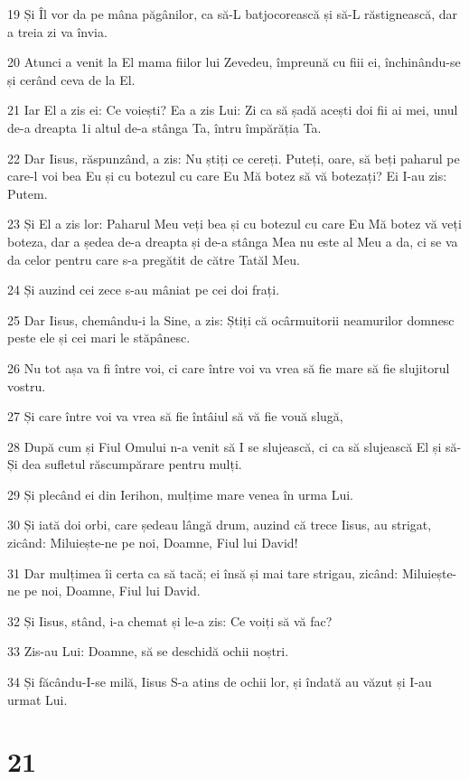 \par 19 Și Îl vor da pe mâna păgânilor, ca să-L batjocorească și să-L răstignească, dar a treia zi va învia.
\par 20 Atunci a venit la El mama fiilor lui Zevedeu, împreună cu fiii ei, închinându-se și cerând ceva de la El.
\par 21 Iar El a zis ei: Ce voiești? Ea a zis Lui: Zi ca să șadă acești doi fii ai mei, unul de-a dreapta 1i altul de-a stânga Ta, întru împărăția Ta.
\par 22 Dar Iisus, răspunzând, a zis: Nu știți ce cereți. Puteți, oare, să beți paharul pe care-l voi bea Eu și cu botezul cu care Eu Mă botez să vă botezați? Ei I-au zis: Putem.
\par 23 Și El a zis lor: Paharul Meu veți bea și cu botezul cu care Eu Mă botez vă veți boteza, dar a ședea de-a dreapta și de-a stânga Mea nu este al Meu a da, ci se va da celor pentru care s-a pregătit de către Tatăl Meu.
\par 24 Și auzind cei zece s-au mâniat pe cei doi frați.
\par 25 Dar Iisus, chemându-i la Sine, a zis: Știți că ocârmuitorii neamurilor domnesc peste ele și cei mari le stăpânesc.
\par 26 Nu tot așa va fi între voi, ci care între voi va vrea să fie mare să fie slujitorul vostru.
\par 27 Și care între voi va vrea să fie întâiul să vă fie vouă slugă,
\par 28 După cum și Fiul Omului n-a venit să I se slujească, ci ca să slujească El și să-Și dea sufletul răscumpărare pentru mulți.
\par 29 Și plecând ei din Ierihon, mulțime mare venea în urma Lui.
\par 30 Și iată doi orbi, care ședeau lângă drum, auzind că trece Iisus, au strigat, zicând: Miluiește-ne pe noi, Doamne, Fiul lui David!
\par 31 Dar mulțimea îi certa ca să tacă; ei însă și mai tare strigau, zicând: Miluiește-ne pe noi, Doamne, Fiul lui David.
\par 32 Și Iisus, stând, i-a chemat și le-a zis: Ce voiți să vă fac?
\par 33 Zis-au Lui: Doamne, să se deschidă ochii noștri.
\par 34 Și făcându-I-se milă, Iisus S-a atins de ochii lor, și îndată au văzut și I-au urmat Lui.

\chapter{21}

